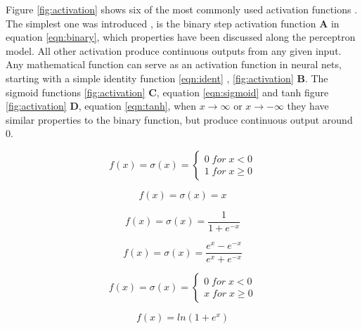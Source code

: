 Figure \ref{fig:activation} shows six of the most commonly used activation functions
\cite{warner1996understanding}. The simplest one was introduced , is the binary step activation function \textbf{A} in
equation \ref{eqn:binary}, which properties have been discussed along the perceptron model. All other
activation produce continuous outputs from any given input. Any mathematical function can serve as
an activation function in neural nets, starting with a simple identity function \ref{eqn:ident} ,
\ref{fig:activation} \textbf{B}. The sigmoid functions \ref{fig:activation} \textbf{C}, equation \ref{eqn:sigmoid}
and tanh figure \ref{fig:activation} \textbf{D}, equation \ref{eqn:tanh}, when $x \rightarrow \infty$ or
$x \rightarrow -\infty$ they have similar properties to the binary function, but produce continuous output
around 0.

\begin{equation}
 f(x)= \sigma(x) = \left\{
 \begin{array}{ll}
 0 \; for \; x < 0 \\ 
 1 \; for \; x \geq 0
 \end{array}
\right .
\label{eqn:binary}
\end{equation}

\begin{equation}
 f(x) = \sigma(x) = x
 \label{eqn:ident}
\end{equation}
    
\begin{equation}
 f(x) = \sigma(x) = \frac{1}{1+e^{-x}} 
 \label{eqn:sigmoid}
\end{equation}

\begin{equation}
 f(x) = \sigma(x) = \frac{e^x - e^{-x}}{e^x + e^{-x}}
 \label{eqn:tanh}
\end{equation}

\begin{equation}
 f(x)= \sigma(x) = \left\{
 \begin{array}{ll}
 0 \; for \; x < 0 \\ 
 x \; for \; x \geq 0
 \end{array}
\right .
\label{eqn:relu}
\end{equation}

\begin{equation}
 f(x) = ln(1+e^x)
 \label{eqn:softplus}
\end{equation}

